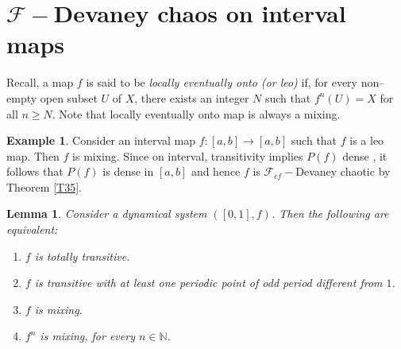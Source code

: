 \documentclass{amsart}[12pt, papera4]
\newtheorem{lemma}[theorem]{Lemma}
\theoremstyle{definition}
\newtheorem{example}[theorem]{Example}
\theoremstyle{remark}
\numberwithin{equation}{section}
\def\N{{\mathbb N}}
\def\F{{\mathscr{F}}}
\begin{document}
\section{$\F-$Devaney chaos on interval maps}
\medskip
\noindent Recall, a map $f$ is said to be \emph{locally eventually onto (or leo)} if, for every non--empty open subset $U$ of $X$, there exists an integer $N$ such that $f^n(U)=X$ for all $n\geq N$. Note that locally eventually onto map is always a mixing.
\begin{example}
	Consider an interval map $f:[a,b]\longrightarrow [a,b]$ such that $f$ is a leo map. Then $f$ is mixing. Since on interval, transitivity implies $P(f)$ dense \cite{SR}, it follows that $P(f)$ is dense in $[a,b]$ and hence $f$ is $\F_{cf}-$Devaney chaotic by Theorem \ref{T35}.
\end{example}

\begin{lemma}\cite{SR}\label{L1}
	Consider a dynamical system $([0,1],f)$. Then the following are equivalent:
	\begin{enumerate}
		\item $f$ is totally transitive.
		\item $f$ is transitive with at least one periodic point of odd period different from $1$.
		\item $f$ is mixing.
		\item $f^n$ is mixing, for every $n\in \N$.
		
	\end{enumerate}
\end{lemma}
\end{document}
